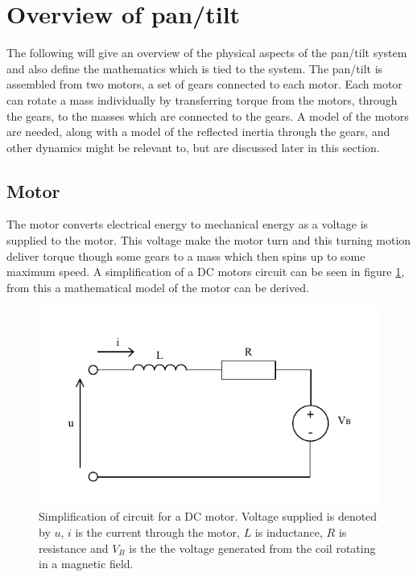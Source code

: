 \section{Overview of pan/tilt}
The following will give an overview of the physical aspects of the pan/tilt system and also define the mathematics which is tied to the system. The pan/tilt is assembled from two motors, a set of gears connected to each motor. Each motor can rotate a mass individually by transferring torque from the motors, through the gears, to the masses which are connected to the gears. A model of the motors are needed, along with a model of the reflected inertia through the gears, and other dynamics might be relevant to, but are discussed later in this section.

\subsection{Motor}
The motor converts electrical energy to mechanical energy as a voltage is supplied to the motor. This voltage make the motor turn and this turning motion deliver torque though some gears to a mass which then spins up to some maximum speed. A simplification of a DC motors circuit can be seen in figure \ref{fig:motor_circuit}, from this a mathematical model of the motor can be derived.
\begin{figure}[htb]
	\centering
	\includegraphics[scale=1,trim=0 0 0 0]{graphics/motor_circuit.pdf} %
	\caption{Simplification of circuit for a DC motor. Voltage supplied is denoted by $u$, $i$ is the current through the motor, $L$ is inductance, $R$ is resistance and $V_B$ is the the voltage generated from the coil rotating in a magnetic field.}
	\label{fig:motor_circuit}			%
\end{figure}
